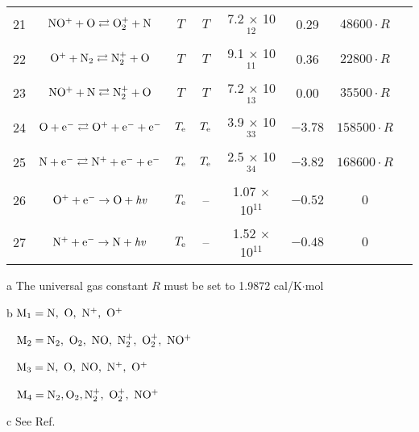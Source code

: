 \documentclass{warpdoc}
\begin{document}
\begin{table}[t]
\begin{center}
\begin{threeparttable}
\begin{tabular}{cccccccc}
21 & $\rm NO^+ + O \rightleftarrows O_2^+ + N $ & $T$ & $T$  & 7.2 $\times$ 10$^{12}$  & 0.29 & $48600 \cdot R$ & \cite{book:1990:park}\\

22 & $\rm O^+ + N_2 \rightleftarrows N_2^+ + O $ & $T$ & $T$  & 9.1 $\times$ 10$^{11}$  & 0.36 & $22800 \cdot R$ & \cite{book:1990:park}\\

23 & $\rm NO^+ + N \rightleftarrows N_2^+ + O $ & $T$ & $T$  & 7.2 $\times$ 10$^{13}$  & 0.00 & $35500 \cdot R$ & \cite{book:1990:park}\\


24 & $\rm O + e^- \rightleftarrows O^+ + e^- + e^- $ & $T_{\rm e}$ & $T_{\rm e}$ & 3.9 $\times$ 10$^{33}$  & $-3.78$ & $158500 \cdot R$ & \cite{book:1990:park}\\

25 & $\rm N + e^- \rightleftarrows N^+ + e^- + e^- $ & $T_{\rm e}$ & $T_{\rm e}$ & 2.5 $\times$ 10$^{34}$  & $-3.82$ & $168600 \cdot R$ & \cite{book:1990:park}\\

26 & $\rm O^+ + e^- \rightarrow O + {\it hv} $ & $T_{\rm e}$ & -- & 1.07 $\times$ 10$^{11}$  & $-0.52$ & $0$ & \cite{jtht:1993:park}\\
27 & $\rm N^+ + e^- \rightarrow N + {\it hv} $ & $T_{\rm e}$ & -- & 1.52 $\times$ 10$^{11}$  & $-0.48$ & $0$ & \cite{jtht:1993:park}\\
\bottomrule
\end{tabular}
\begin{tablenotes}
\item[{a}] The universal gas constant $R$ must be set to 1.9872	cal/K$\cdot$mol 
\item[{b}] $\rm M_1=N,~O,~N^+,~O^+$
\item[~] $\rm M_2=N_2,~O_2,~NO,~N_2^+,~O_2^+,~NO^+$
\item[~] $\rm M_3= N,~O,~NO,~N^+,~O^+$
\item[~] $\rm M_4=N_2,O_2,N_2^+,~O_2^+,~NO^+$
\item[{c}] See Ref.\ \cite{jtht:1991:candler}
\end{tablenotes}
\label{tab:parkcandlerboyd}
\end{threeparttable}
\end{center}
\end{table}
%
\end{document}
